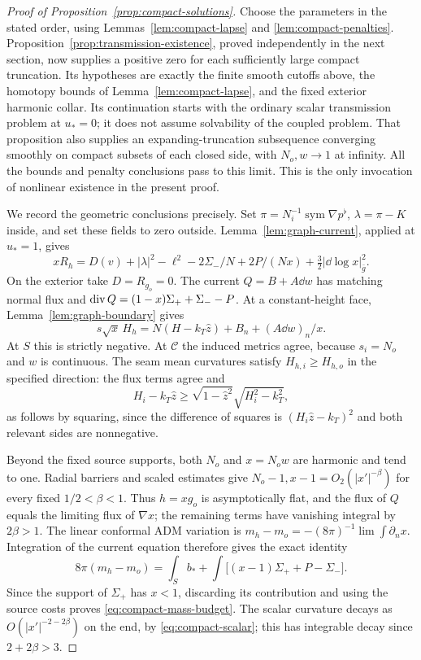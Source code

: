 \begin{proof}[Proof of Proposition~\ref{prop:compact-solutions}]
Choose the parameters in the stated order, using
Lemmas~\ref{lem:compact-lapse} and \ref{lem:compact-penalties}.
Proposition~\ref{prop:transmission-existence}, proved independently in
the next section, now supplies a positive zero for each sufficiently
large compact truncation. Its hypotheses are exactly the finite
smooth cutoffs above, the homotopy bounds of
Lemma~\ref{lem:compact-lapse}, and the fixed exterior harmonic collar.
Its continuation starts with the ordinary scalar transmission problem
at $u_*=0$; it does not assume solvability of the coupled problem.
That proposition also supplies an expanding-truncation subsequence
converging smoothly on compact subsets of each closed side, with
$N_o,w\to1$ at infinity. All the bounds and penalty conclusions pass
to this limit. This is the only invocation of nonlinear existence in
the present proof.

We record the geometric conclusions precisely. Set
$\pi=N_i^{-1}\operatorname{sym}\nabla p^\flat$,
$\lambda=\pi-K$ inside, and set these fields to zero outside.
Lemma~\ref{lem:graph-current}, applied at $u_*=1$, gives
\begin{equation}\label{eq:compact-scalar}
 xR_h=D(v)+|\lambda|^2-\ell^2-2\Sigma_-/N
       +2P/(Nx)+\tfrac32|\dd\log x|_{\bar g}^2.
\end{equation}
On the exterior take $D=R_{g_o}=0$. The current
$Q=B+A\dd w$ has matching normal flux and
$\operatorname{div} Q=(1-x)\Sigma_++\Sigma_- -P$. At a constant-height face,
Lemma~\ref{lem:graph-boundary} gives
\begin{equation}\label{eq:compact-mean-curvature}
 s\sqrt{x}\,H_h
 =N(H-k_T\widehat z)+B_n+(A\dd w)_n/x.
\end{equation}
At $S$ this is strictly negative. At $\mathcal C$ the induced metrics
agree, because $s_i=N_o$ and $w$ is continuous. The seam mean
curvatures satisfy $H_{h,i}\ge H_{h,o}$ in the specified direction:
the flux terms agree and
\[
 H_i-k_T\widehat z\ge
 \sqrt{1-\widehat z^2}\sqrt{H_i^2-k_T^2},
\]
as follows by squaring, since the difference of squares is
$(H_i\widehat z-k_T)^2$ and both relevant sides are nonnegative.

Beyond the fixed source supports, both $N_o$ and $x=N_ow$ are
harmonic and tend to one. Radial barriers and scaled estimates give
$N_o-1,x-1=O_2(|x'|^{-\beta})$ for every fixed $1/2<\beta<1$.
Thus $h=xg_o$ is asymptotically flat, and the flux of $Q$ equals
the limiting flux of $\nabla x$; the remaining terms have vanishing
integral by $2\beta>1$. The linear conformal ADM variation is
$m_h-m_o=-(8\pi)^{-1}\lim\int\partial_nx$. Integration of the
current equation therefore gives the exact identity
\begin{equation}\label{eq:compact-mass}
 8\pi(m_h-m_o)
 =\int_S b_*+\int\bigl[(x-1)\Sigma_++P-\Sigma_-\bigr].
\end{equation}
Since the support of $\Sigma_+$ has $x<1$, discarding its contribution
and using the source costs proves \eqref{eq:compact-mass-budget}.
The scalar curvature decays as $O(|x'|^{-2-2\beta})$ on the end,
by \eqref{eq:compact-scalar}; this has integrable decay since
$2+2\beta>3$.
\end{proof}

